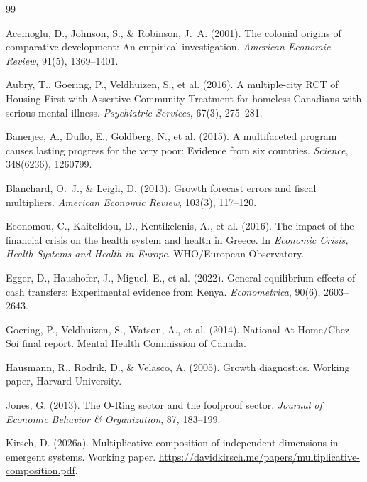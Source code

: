 \documentclass[12pt]{article}
\begin{document}
\begin{thebibliography}{99}

Acemoglu, D., Johnson, S., \& Robinson, J.~A. (2001).
The colonial origins of comparative development: An empirical investigation.
\emph{American Economic Review}, 91(5), 1369--1401.

Aubry, T., Goering, P., Veldhuizen, S., et al. (2016).
A multiple-city RCT of Housing First with Assertive Community Treatment for homeless Canadians with serious mental illness.
\emph{Psychiatric Services}, 67(3), 275--281.

Banerjee, A., Duflo, E., Goldberg, N., et al. (2015).
A multifaceted program causes lasting progress for the very poor: Evidence from six countries.
\emph{Science}, 348(6236), 1260799.

Blanchard, O.~J., \& Leigh, D. (2013).
Growth forecast errors and fiscal multipliers.
\emph{American Economic Review}, 103(3), 117--120.

Economou, C., Kaitelidou, D., Kentikelenis, A., et al. (2016).
The impact of the financial crisis on the health system and health in Greece.
In \emph{Economic Crisis, Health Systems and Health in Europe}. WHO/European Observatory.

Egger, D., Haushofer, J., Miguel, E., et al. (2022).
General equilibrium effects of cash transfers: Experimental evidence from Kenya.
\emph{Econometrica}, 90(6), 2603--2643.

Goering, P., Veldhuizen, S., Watson, A., et al. (2014).
National At Home/Chez Soi final report.
Mental Health Commission of Canada.

Hausmann, R., Rodrik, D., \& Velasco, A. (2005).
Growth diagnostics.
Working paper, Harvard University.

Jones, G. (2013).
The O-Ring sector and the foolproof sector.
\emph{Journal of Economic Behavior \& Organization}, 87, 183--199.

Kirsch, D. (2026a).
Multiplicative composition of independent dimensions in emergent systems.
Working paper. \url{https://davidkirsch.me/papers/multiplicative-composition.pdf}.


\end{thebibliography}
\end{document}
